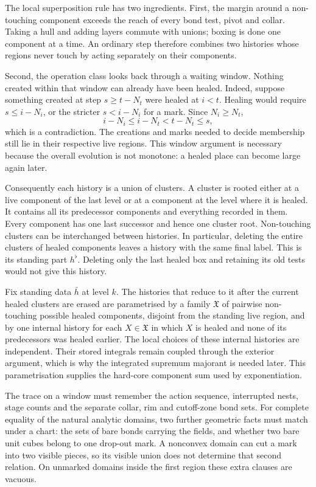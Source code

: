 \documentclass[11pt,letterpaper,reqno]{amsart}
\theoremstyle{definition}
\theoremstyle{remark}
\begin{document}
The local superposition rule has
two ingredients. First, the
margin around a non-touching
component exceeds the reach of
every bond test, pivot and
collar. Taking a hull and adding
layers commute with unions;
boxing is done one component at
a time. An ordinary step
therefore combines two histories
whose regions never touch by
acting separately on their
components.

Second, the operation class
looks back through a waiting
window. Nothing created within
that window can already have
been healed. Indeed, suppose
something created at step
$s\ge t-N_t$ were healed at
$i<t$. Healing would require
$s\le i-N_i$, or the stricter
$s<i-N_i$ for a mark. Since
$N_i\ge N_t$,
\[
 i-N_i\le i-N_t<t-N_t\le s,
\]
which is a contradiction.
The creations and marks needed
to decide membership still
lie in their respective live
regions. This window argument
is necessary because the
overall evolution is not
monotone: a healed place can
become large again later.

Consequently each history is
a union of clusters. A cluster
is rooted either at a live
component of the last level
or at a component at the level
where it is healed. It contains
all its predecessor components
and everything recorded in
them. Every component has one
last successor and hence one
cluster root. Non-touching
clusters can be interchanged
between histories. In
particular, deleting the
entire clusters of healed
components leaves a history
with the same final label.
This is its standing part
$h^\flat$. Deleting only the
last healed box and retaining
its old tests would not give
this history.

Fix standing data $\bar h$ at
level $k$. The histories that
reduce to it after the current
healed clusters are erased are
parametrised by a family
$\mathfrak X$ of pairwise
non-touching possible healed
components, disjoint from the
standing live region, and by
one internal history for each
$X\in\mathfrak X$ in which
$X$ is healed and none of its
predecessors was healed earlier.
The local choices of these
internal histories are
independent. Their stored
integrals remain coupled through
the exterior argument, which
is why the integrated supremum
majorant is needed later.
This parametrisation supplies
the hard-core component sum
used by exponentiation.

The trace on a window must
remember the action sequence,
interrupted nests, stage counts
and the separate collar, rim
and cutoff-zone bond sets.
For complete equality of the
natural analytic domains,
two further geometric facts
must match under a chart:
the sets of bare bonds
carrying the fields, and
whether two bare unit cubes
belong to one drop-out mark.
A nonconvex domain can cut
a mark into two visible
pieces, so its visible union
does not determine that
second relation. On unmarked
domains inside the first
region these extra clauses
are vacuous.
\end{document}
